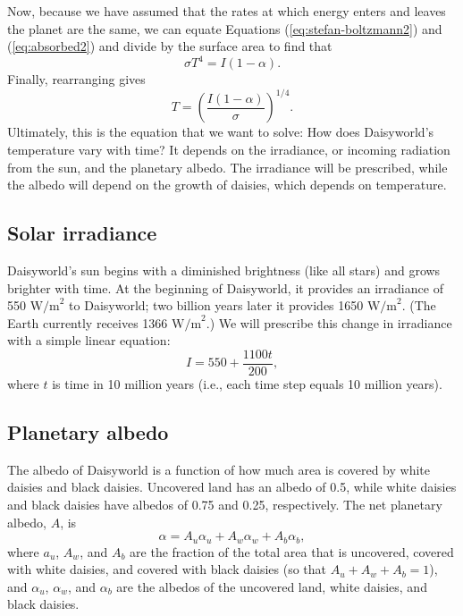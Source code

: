\documentclass[11pt,letterpaper]{article}
\begin{document}
Now, because we have assumed that the rates at which energy enters and leaves the planet are the same, we can equate Equations (\ref{eq:stefan-boltzmann2}) and (\ref{eq:absorbed2}) and divide by the surface area to find that
\begin{equation}
\sigma{T^4}=I(1-\alpha).
\end{equation}
Finally, rearranging gives
\begin{equation}
T=\left(\frac{I(1-\alpha)}{\sigma}\right)^{1/4}.
\end{equation}
Ultimately, this is the equation that we want to solve: How does Daisyworld's temperature vary with time? It depends on the irradiance, or incoming radiation from the sun, and the planetary albedo. The irradiance will be prescribed, while the albedo will depend on the growth of daisies, which depends on temperature. 


\subsection{Solar irradiance}
Daisyworld's sun begins with a diminished brightness (like all stars) and grows brighter with time. At the beginning of Daisyworld, it provides an irradiance of 550 $\mbox{W/m}^2$ to Daisyworld; two billion years later it provides 1650 $\mbox{W/m}^2$. (The Earth currently receives 1366 $\mbox{W/m}^2$.) We will prescribe this change in irradiance with a simple linear equation:
\begin{equation}
I=550+\frac{1100t}{200},
\end{equation}
\noindent where $t$ is time in 10 million years (i.e., each time step equals 10 million years).

\subsection{Planetary albedo}
The albedo of Daisyworld is a function of how much area is covered by white daisies and black daisies. Uncovered land has an albedo of 0.5, while white daisies and black daisies have albedos of 0.75 and 0.25, respectively. The net planetary albedo, $A$, is
\begin{equation}
\alpha=A_{u}\alpha_{u}+A_w\alpha_w+A_b\alpha_b,
\end{equation}
\noindent where $a_{u}$, $A_w$, and $A_b$ are the fraction of the total area that is uncovered, covered with white daisies, and covered with black daisies (so that $A_{u}+A_w+A_b=1$), and $\alpha_{u}$, $\alpha_w$, and $\alpha_b$ are the albedos of the uncovered land, white daisies, and black daisies.
\end{document}
